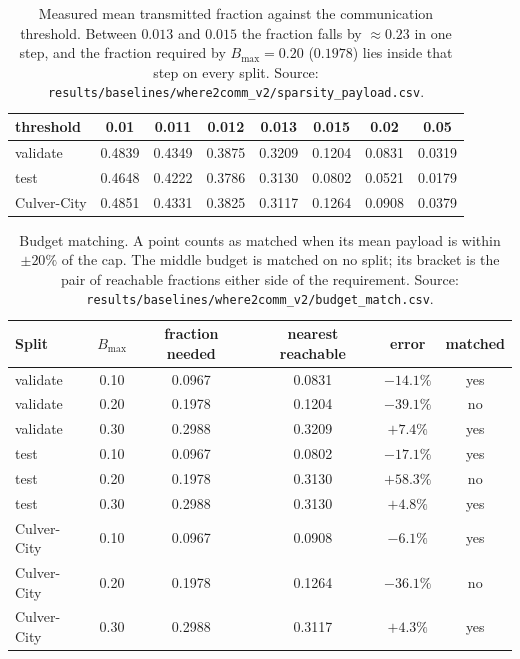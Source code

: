 \documentclass[journal]{IEEEtran}
\begin{document}
\begin{table}[t]
\centering
\footnotesize
\setlength{\tabcolsep}{3pt}
\caption{Measured mean transmitted fraction against the communication threshold. Between $0.013$ and
$0.015$ the fraction falls by ${\approx}0.23$ in one step, and the fraction required by
$B_{\max}=0.20$ ($0.1978$) lies inside that step on every split.
Source: \texttt{results/baselines/where2comm\_v2/sparsity\_payload.csv}.}
\label{tab:w2c_cliff}
\begin{tabular}{lccccccc}
\toprule
threshold & 0.01 & 0.011 & 0.012 & 0.013 & 0.015 & 0.02 & 0.05 \\
\midrule
validate    & 0.4839 & 0.4349 & 0.3875 & 0.3209 & 0.1204 & 0.0831 & 0.0319 \\
test        & 0.4648 & 0.4222 & 0.3786 & 0.3130 & 0.0802 & 0.0521 & 0.0179 \\
Culver-City & 0.4851 & 0.4331 & 0.3825 & 0.3117 & 0.1264 & 0.0908 & 0.0379 \\
\bottomrule
\end{tabular}
\end{table}

\begin{table}[t]
\centering
\footnotesize
\setlength{\tabcolsep}{3pt}
\caption{Budget matching. A point counts as matched when its mean payload is within $\pm20\%$ of the
cap. The middle budget is matched on no split; its bracket is the pair of reachable fractions either
side of the requirement. Source: \texttt{results/baselines/where2comm\_v2/budget\_match.csv}.}
\label{tab:w2c_budget_match}
\begin{tabular}{lccccc}
\toprule
Split & $B_{\max}$ & fraction needed & nearest reachable & error & matched \\
\midrule
validate    & 0.10 & 0.0967 & 0.0831 & $-14.1\%$ & yes \\
validate    & 0.20 & 0.1978 & 0.1204 & $-39.1\%$ & no \\
validate    & 0.30 & 0.2988 & 0.3209 & $+7.4\%$  & yes \\
\midrule
test        & 0.10 & 0.0967 & 0.0802 & $-17.1\%$ & yes \\
test        & 0.20 & 0.1978 & 0.3130 & $+58.3\%$ & no \\
test        & 0.30 & 0.2988 & 0.3130 & $+4.8\%$  & yes \\
\midrule
Culver-City & 0.10 & 0.0967 & 0.0908 & $-6.1\%$  & yes \\
Culver-City & 0.20 & 0.1978 & 0.1264 & $-36.1\%$ & no \\
Culver-City & 0.30 & 0.2988 & 0.3117 & $+4.3\%$  & yes \\
\bottomrule
\end{tabular}
\end{table}
\end{document}
